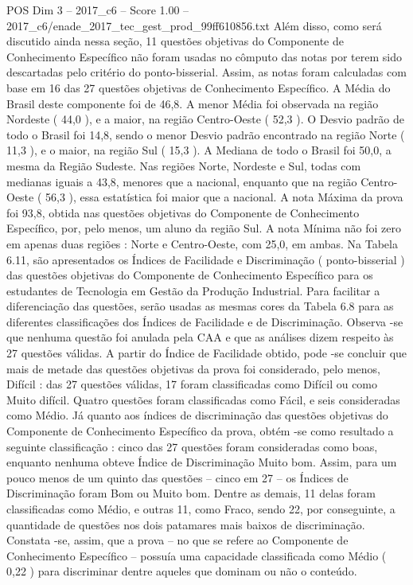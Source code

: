 \begin{textsample}{POS Dim 3 – 2017\_c6 – Score 1.00 – 2017\_c6/enade\_2017\_tec\_gest\_prod\_99ff610856.txt}
Além disso, como será discutido ainda nessa seção, 11 questões objetivas do Componente de Conhecimento Específico não foram usadas no cômputo das notas por terem sido descartadas pelo critério do ponto-bisserial.
Assim, as notas foram calculadas com base em 16 das 27 questões objetivas de Conhecimento Específico.
A Média do Brasil deste componente foi de 46,8.
A menor Média foi observada na região Nordeste ( 44,0 ), e a maior, na região Centro-Oeste ( 52,3 ).
O Desvio padrão de todo o Brasil foi 14,8, sendo o menor Desvio padrão encontrado na região Norte ( 11,3 ), e o maior, na região Sul ( 15,3 ).
A Mediana de todo o Brasil foi 50,0, a mesma da Região Sudeste.
Nas regiões Norte, Nordeste e Sul, todas com medianas iguais a 43,8, menores que a nacional, enquanto que na região Centro-Oeste ( 56,3 ), essa estatística foi maior que a nacional.
A nota Máxima da prova foi 93,8, obtida nas questões objetivas do Componente de Conhecimento Específico, por, pelo menos, um aluno da região Sul.
A nota Mínima não foi zero em apenas duas regiões : Norte e Centro-Oeste, com 25,0, em ambas.
Na Tabela 6.11, são apresentados os Índices de Facilidade e Discriminação ( ponto-bisserial ) das questões objetivas do Componente de Conhecimento Específico para os estudantes de Tecnologia em Gestão da Produção Industrial.
Para facilitar a diferenciação das questões, serão usadas as mesmas cores da Tabela 6.8 para as diferentes classificações dos Índices de Facilidade e de Discriminação.
Observa -se que nenhuma questão foi anulada pela CAA e que as análises dizem respeito às 27 questões válidas.
A partir do Índice de Facilidade obtido, pode -se concluir que mais de metade das questões objetivas da prova foi considerado, pelo menos, Difícil : das 27 questões válidas, 17 foram classificadas como Difícil ou como Muito difícil.
Quatro questões foram classificadas como Fácil, e seis consideradas como Médio.
Já quanto aos índices de discriminação das questões objetivas do Componente de Conhecimento Específico da prova, obtém -se como resultado a seguinte classificação : cinco das 27 questões foram consideradas como boas, enquanto nenhuma obteve Índice de Discriminação Muito bom.
Assim, para um pouco menos de um quinto das questões – cinco em 27 – os Índices de Discriminação foram Bom ou Muito bom.
Dentre as demais, 11 delas foram classificadas como Médio, e outras 11, como Fraco, sendo 22, por conseguinte, a quantidade de questões nos dois patamares mais baixos de discriminação.
Constata -se, assim, que a prova – no que se refere ao Componente de Conhecimento Específico – possuía uma capacidade classificada como Médio ( 0,22 ) para discriminar dentre aqueles que dominam ou não o conteúdo.

\end{textsample}
